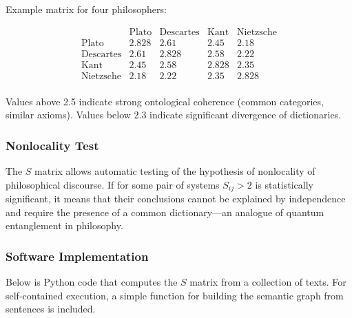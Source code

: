 \documentclass[12pt,a4paper]{article}
\begin{document}
	Example matrix for four philosophers:
	
	\[
	\begin{array}{c|cccc}
		& \text{Plato} & \text{Descartes} & \text{Kant} & \text{Nietzsche} \\
		\hline
		\text{Plato} & 2.828 & 2.61 & 2.45 & 2.18 \\
		\text{Descartes} & 2.61 & 2.828 & 2.58 & 2.22 \\
		\text{Kant}   & 2.45 & 2.58 & 2.828 & 2.35 \\
		\text{Nietzsche}  & 2.18 & 2.22 & 2.35 & 2.828 \\
	\end{array}
	\]
	
	Values above 2.5 indicate strong ontological coherence (common categories, similar axioms). Values below 2.3 indicate significant divergence of dictionaries.
	
	\subsubsection{Nonlocality Test}
	
	The \(S\) matrix allows automatic testing of the hypothesis of nonlocality of philosophical discourse. If for some pair of systems \(S_{ij} > 2\) is statistically significant, it means that their conclusions cannot be explained by independence and require the presence of a common dictionary—an analogue of quantum entanglement in philosophy.
	
	\subsubsection{Software Implementation}
	
	Below is Python code that computes the \(S\) matrix from a collection of texts. For self‑contained execution, a simple function for building the semantic graph from sentences is included.
	
\end{document}
